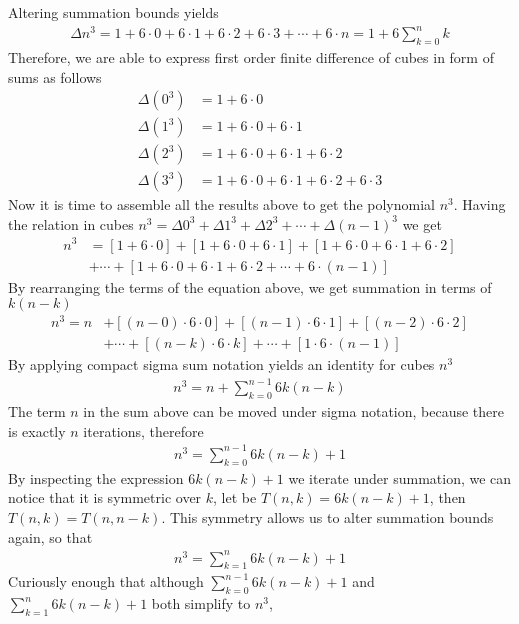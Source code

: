 Altering summation bounds yields
\begin{align*}
    \label{eq:first-difference-in-terms-of-second-difference}
    \Delta n^3 = 1+6\cdot0+6\cdot1+6\cdot2+6\cdot3+\cdots+6\cdot n = 1 + 6 \sum_{k=0}^{n} k
\end{align*}
Therefore, we are able to express first order finite difference of cubes in form of sums as follows
\begin{align*}
    \Delta(0^3) &= 1+6 \cdot 0 \\
    \Delta(1^3) &= 1+6\cdot0+6\cdot1 \\
    \Delta(2^3) &= 1+6\cdot0+6\cdot1+6\cdot2 \\
    \Delta(3^3) &= 1+6\cdot0+6\cdot1+6\cdot2+6\cdot3
\end{align*}
Now it is time to assemble all the results above to get the polynomial $n^3$.
Having the relation in cubes $n^3 = \Delta 0^3 + \Delta 1^3 + \Delta 2^3 + \cdots + \Delta (n-1)^3$
we get
\begin{align*}
    n^3 &= [1+6\cdot0]+[1+6\cdot0+6\cdot1]+[1+6\cdot0+6\cdot1+6\cdot2] \nonumber \\
    &+ \cdots + [1+6\cdot0+6\cdot1+6\cdot2+\cdots+6\cdot(n-1)]
\end{align*}
By rearranging the terms of the equation above, we get summation in terms of $k (n-k)$
\begin{align*}
    n^3 = n &+ [(n-0) \cdot 6 \cdot 0] + [(n-1)\cdot6\cdot1] + [(n-2)\cdot6\cdot2] \\
    &+ \cdots + [(n-k)\cdot 6 \cdot k] + \cdots + [1\cdot6\cdot(n-1)]
\end{align*}
By applying compact sigma sum notation yields an identity for cubes $n^3$
\begin{align*}
    n^3 = n + \sum_{k=0}^{n-1} 6k(n-k)
\end{align*}
The term $n$ in the sum above can be moved under sigma notation, because there is exactly $n$ iterations, therefore
\begin{align*}
    n^3 = \sum_{k=0}^{n-1} 6k(n-k) + 1
\end{align*}
By inspecting the expression $6k(n-k) + 1$ we iterate under summation,
we can notice that it is symmetric over $k$, let be $T(n,k) = 6k(n-k) + 1$, then $T(n,k) = T(n,n-k)$.
This symmetry allows us to alter summation bounds again, so that
\begin{align*}
    n^3 = \sum_{k=1}^{n} 6k(n-k) + 1
\end{align*}
Curiously enough that although $\sum_{k=0}^{n-1} 6k(n-k) + 1$ and $\sum_{k=1}^{n} 6k(n-k) + 1$ both simplify to $n^3$,
